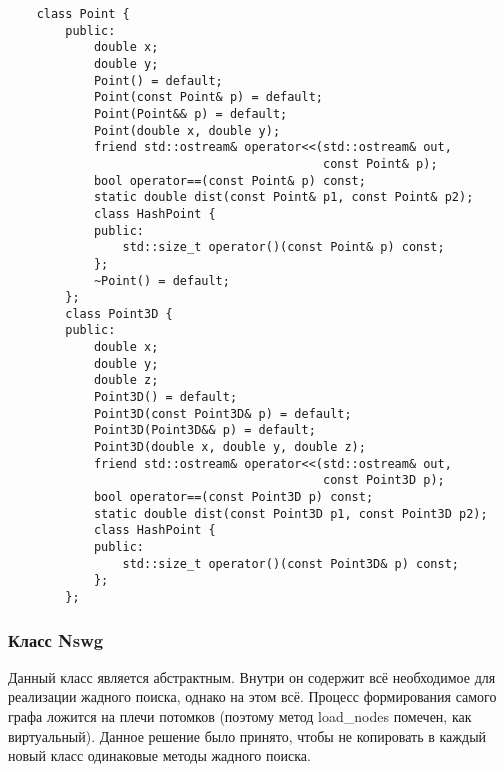 \begin{verbatim}
    class Point {
        public:
            double x;
            double y;
            Point() = default;
            Point(const Point& p) = default;
            Point(Point&& p) = default;
            Point(double x, double y);
            friend std::ostream& operator<<(std::ostream& out, 
                                            const Point& p);
            bool operator==(const Point& p) const;
            static double dist(const Point& p1, const Point& p2);
            class HashPoint {
            public:
                std::size_t operator()(const Point& p) const;
            };
            ~Point() = default;
        };
        class Point3D {
        public:
            double x;
            double y;
            double z;
            Point3D() = default;
            Point3D(const Point3D& p) = default;
            Point3D(Point3D&& p) = default;
            Point3D(double x, double y, double z);
            friend std::ostream& operator<<(std::ostream& out, 
                                            const Point3D p);
            bool operator==(const Point3D p) const;
            static double dist(const Point3D p1, const Point3D p2);
            class HashPoint {
            public:
                std::size_t operator()(const Point3D& p) const;
            };
        };
\end{verbatim}

\subsubsection{Класс Nswg} 


Данный класс является абстрактным. Внутри он содержит всё необходимое для реали\-зации
жадного поиска, однако на этом всё. Процесс формирования самого графа ложится на плечи
потомков (поэтому метод load\_nodes помечен, как виртуальный). Данное ре\-шение было принято, чтобы не копировать в каждый новый класс одинаковые 
методы жадного поиска.

